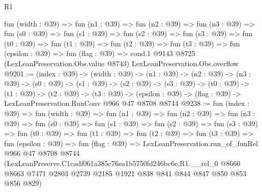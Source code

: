 \begin{lexlean}{R1}
\begin{coremodule}
  fun (width : @39) =>
  fun (n1 : @39) =>
  fun (n2 : @39) =>
  fun (n3 : @39) =>
  fun (s0 : @39) =>
  fun (s1 : @39) =>
  fun (s2 : @39) =>
  fun (s3 : @39) =>
  fun (t0 : @39) =>
  fun (t1 : @39) =>
  fun (t2 : @39) =>
  fun (t3 : @39) =>
  fun (epsilon : @39) =>
  fun (flag : @39) =>
  cond.{1} @9143 @8725 (LexLeanPreservation.Obs.value @8743) LexLeanPreservation.Obs.overflow
@9201 := (index : @39) ->
  (width : @39) ->
  (n1 : @39) ->
  (n2 : @39) ->
  (n3 : @39) ->
  (s0 : @39) ->
  (s1 : @39) ->
  (s2 : @39) ->
  (s3 : @39) ->
  (t0 : @39) ->
  (t1 : @39) ->
  (t2 : @39) ->
  (t3 : @39) -> (epsilon : @39) -> (flag : @39) -> LexLeanPreservation.RunConv @966 @47 @8708 @8744
@9238 := fun (index : @39) =>
  fun (width : @39) =>
  fun (n1 : @39) =>
  fun (n2 : @39) =>
  fun (n3 : @39) =>
  fun (s0 : @39) =>
  fun (s1 : @39) =>
  fun (s2 : @39) =>
  fun (s3 : @39) =>
  fun (t0 : @39) =>
  fun (t1 : @39) =>
  fun (t2 : @39) =>
  fun (t3 : @39) =>
  fun (epsilon : @39) =>
  fun (flag : @39) =>
  LexLeanPreservation.run_of_funRel
    @966
    @47
    @8708
    @8744
    (LexLeanPreserve.C1cadf061a385c76ea1b5750fd246bc6e.R1.__rel_0
      @8660
      @8663
      @7471
      @2803
      @2739
      @2185
      @1921
      @838
      @841
      @844
      @847
      @850
      @853
      @856
      @829)
\end{coremodule}
\end{lexlean}
